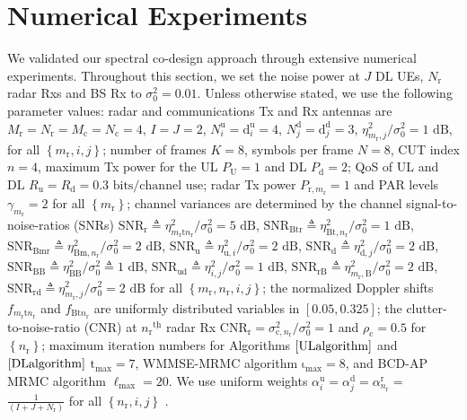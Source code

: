 \documentclass[9pt,journal]{IEEEtran}
\newcommand{\paren}[1]{\left({#1}\right)}
\newcommand{\bracket}[1]{{\left [{#1}\right ]}}
\newcommand{\braces}[1]{{\left\{ {#1}\right\}}}
\newcommand{\ith}[1]    {{#1}^{\underline{\text{th}}}}
\newcommand{\rr}{_\mathrm{r}}
\newcommand{\cc}{_\mathrm{c}}
\newcommand{\sfrac}[2]{#1/#2}
\theoremstyle{definition}
\begin{document}
\section{Numerical Experiments}
\label{sec:numerical}
We validated our spectral co-design approach through extensive numerical experiments. %
Throughout this section, we set the noise power at $\mathit{J}$ DL UEs, $\mathit{N}\rr$ radar Rxs and BS Rx to $\sigma^2_0=0.01$. Unless otherwise stated, we use the following parameter values: radar and communications Tx and Rx antennas are $\mathit{M}\rr=\mathit{N}\rr=\mathit{M}\cc=\mathit{N}\cc=4$, $\mathit{I}=\mathit{J}=2$, $\mathit{N}^{\textrm{u}}_i=\mathrm{d}^{\textrm{u}}_i=4$, $\mathit{N}^{\textrm{d}}_j=\mathrm{d}^{\textrm{d}}_j=3$,  $\sfrac{\eta^2_{m\rr,j}}{\sigma^2_0}=1\textrm{ dB}$, for all $\braces{m\rr,i,j}$; number of frames $\mathit{K}=8$, symbols per frame $\mathit{N}=8$, CUT index $n=4$, maximum Tx power for the UL $\mathit{P}_\textrm{U}=1$ and DL $\mathit{P}_\textrm{d}=2$; QoS of UL and DL $\mathit{R}_{\textrm{u}}=\mathit{R}_{\textrm{d}}=0.3\textrm{ bits/channel use}$; radar Tx power $\mathit{P}_{\textrm{r},m\rr}=1$ and PAR levels $\gamma_{m\rr}=2$ for all $\braces{m\rr}$; channel variances are determined by the channel signal-to-noise-ratios (SNRs) $\mathrm{SNR}_{\textrm{r}}\triangleq\sfrac{\eta^2_{m\rr\textrm{t}n\rr}}{\sigma^2_{0}}=5\textrm{ dB}$, $\mathrm{SNR}_{\textrm{Btr}}\triangleq\sfrac{\eta^2_{\textrm{Bt},n\rr}}{\sigma^2_{0}}=1 \textrm{ dB}$, $\mathrm{SNR}_{\textrm{Bmr}}\triangleq\sfrac{\eta^2_{\textrm{Bm},n\rr}}{\sigma^2_{0}}=2 \textrm{ dB}$, $\mathrm{SNR}_{\textrm{u}}\triangleq\sfrac{\eta^2_{\textrm{u},i}}{\sigma^2_{0}}=2\textrm{ dB}$, $\mathrm{SNR}_{\textrm{d}}\triangleq\sfrac{\eta^2_{\textrm{d},j}}{\sigma^2_0}=2\textrm{ dB}$, $\mathrm{SNR}_{\textrm{BB}}\triangleq\sfrac{\eta^2_{\textrm{BB}}}{\sigma^2_{0}}\triangleq1\textrm{ dB}$, $\mathrm{SNR}_{\textrm{ud}}\triangleq\sfrac{\eta^2_{i,j}}{\sigma^2_{0}}=1\textrm{ dB}$, $\mathrm{SNR}_{\textrm{rB}}\triangleq\sfrac{\eta^2_{m\rr,\textrm{B}}}{\sigma^2_0}=2\textrm{ dB}$, $\mathrm{SNR}_{\textrm{rd}}\triangleq\sfrac{\eta^2_{m\rr,j}}{\sigma^2_0}=2\textrm{ dB}$ for all $\braces{m\rr,n\rr,i,j}$; the normalized Doppler shifts $f_{m\rr\textrm{t}n\rr}$ and $f_{\textrm{Bt}n\rr}$ are uniformly distributed variables in $\bracket{0.05,0.325}$; the clutter-to-noise-ratio (CNR) at $\ith{n\rr}$ radar Rx $\mathrm{CNR}_{\textrm{r}}=\sfrac{\sigma^2_{\text{c},n\rr}}{\sigma^2_0}=1$ and $\rho_{\textrm{c}}=0.5$ for $\braces{n\rr}$; maximum iteration numbers for Algorithms $\ref{ULalgorithm}$ and $\ref{DLalgorithm}$ $\mathrm{t}_{\textrm{max}}=7$, WMMSE-MRMC algorithm $\mathrm{\iota}_{\textrm{max}}=8$, and BCD-AP MRMC algorithm $\mathrm{\ell}_{\textrm{max}}=20$. We use uniform weights  $\alpha^\textrm{u}_{i}= \alpha^{\textrm{d}}_{j}=\alpha^\textrm{r}_{n\rr}=$ $\frac{1}{\paren{\mathit{I}+\mathit{J}+\mathit{N}\rr}}$ for all $\braces{n\rr,i,j}$ .
\end{document}
